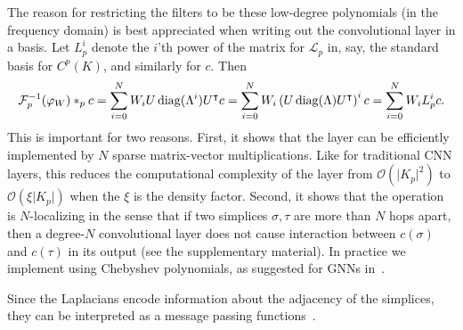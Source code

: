 The reason for restricting the filters to be these low-degree polynomials (in the frequency domain) is best appreciated when writing out the convolutional layer in a basis. Let $L^i_p$ denote the $i$'th power of the matrix for $\mathcal{L}_p$ in, say, the standard basis for $C^p(K)$, and similarly for $c$. Then
\begin{equation}
  \mathcal{F}^{-1}_p(\varphi_W)\ast_p c = \sum_{i=0}^N W_iU\operatorname{diag}(\Lambda^i)U^{\intercal} c = \sum_{i=0}^N W_i\left(U\operatorname{diag}(\Lambda)U^{\intercal}\right)^i c = \sum_{i=0}^NW_iL^i_pc. \label{eq:filter}
\end{equation}
This is important for two reasons. First, it shows that the layer can be efficiently implemented by $N$ sparse matrix-vector multiplications. Like for traditional CNN layers, this reduces the computational complexity of the layer from $\mathcal{O}(\lvert K_p\rvert^2)$ to $\mathcal{O}(\xi\lvert K_p\rvert)$ when the $\xi$ is the density factor. Second, it shows that the operation is $N$-localizing in the sense that if two simplices $\sigma,\tau$ are more than $N$ hops apart, then a degree-$N$ convolutional layer does not cause interaction between $c(\sigma)$ and $c(\tau)$ in its output (see the supplementary material). In practice we implement  using Chebyshev polynomials, as suggested for GNNs in~\cite{defferrard2016convolutional}.

Since the Laplacians encode information about the adjacency of the simplices, they can be interpreted as a message passing functions~\cite{gilmer2017NeuralMP}.

